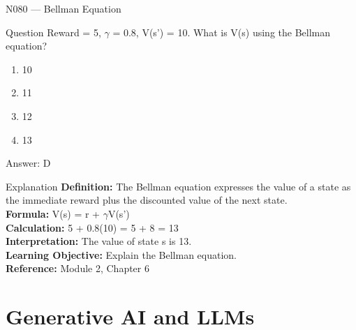 \documentclass[aspectratio=169,8pt]{beamer}
\begin{document}
	\begin{frame}{N080 --- Bellman Equation}
		\begin{block}{Question}
			Reward = 5, $\gamma$ = 0.8, V(s') = 10. What is V(s) using the Bellman equation?
			\begin{enumerate}
				\item 10
				\item 11
				\item 12
				\item 13
			\end{enumerate}
		\end{block}
		\begin{exampleblock}{Answer: D}\end{exampleblock}
		\begin{block}{Explanation}
			\textbf{Definition:} The Bellman equation expresses the value of a state as the immediate reward plus the discounted value of the next state.\\
			\textbf{Formula:} V(s) = r + $\gamma$V(s')\\
			\textbf{Calculation:} 5 + 0.8(10) = 5 + 8 = 13\\
			\textbf{Interpretation:} The value of state s is 13.\\
			\textbf{Learning Objective:} Explain the Bellman equation.\\
			\textbf{Reference:} Module 2, Chapter 6
		\end{block}
	\end{frame}
	
	\section{Generative AI and LLMs}
	
\end{document}
